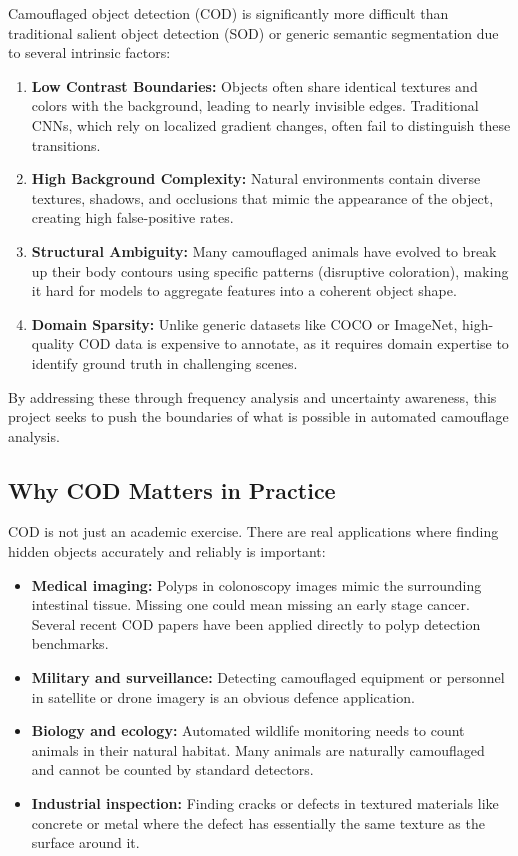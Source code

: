 \documentclass[12pt,a4paper]{report}
\begin{document}
Camouflaged object detection (COD) is significantly more difficult than traditional salient object detection (SOD) or generic semantic segmentation due to several intrinsic factors:

\begin{enumerate}
    \item \textbf{Low Contrast Boundaries:} Objects often share identical textures and colors with the background, leading to nearly invisible edges. Traditional CNNs, which rely on localized gradient changes, often fail to distinguish these transitions.
    \item \textbf{High Background Complexity:} Natural environments contain diverse textures, shadows, and occlusions that mimic the appearance of the object, creating high false-positive rates.
    \item \textbf{Structural Ambiguity:} Many camouflaged animals have evolved to break up their body contours using specific patterns (disruptive coloration), making it hard for models to aggregate features into a coherent object shape.
    \item \textbf{Domain Sparsity:} Unlike generic datasets like COCO or ImageNet, high-quality COD data is expensive to annotate, as it requires domain expertise to identify ground truth in challenging scenes.
\end{enumerate}

By addressing these through frequency analysis and uncertainty awareness, this project seeks to push the boundaries of what is possible in automated camouflage analysis.

\subsection*{Why COD Matters in Practice}

COD is not just an academic exercise. There are real applications where finding hidden objects accurately and reliably is important:

\begin{itemize}
  \item \textbf{Medical imaging:} Polyps in colonoscopy images mimic the surrounding intestinal tissue. Missing one could mean missing an early stage cancer. Several recent COD papers have been applied directly to polyp detection benchmarks.
  \item \textbf{Military and surveillance:} Detecting camouflaged equipment or personnel in satellite or drone imagery is an obvious defence application.
  \item \textbf{Biology and ecology:} Automated wildlife monitoring needs to count animals in their natural habitat. Many animals are naturally camouflaged and cannot be counted by standard detectors.
  \item \textbf{Industrial inspection:} Finding cracks or defects in textured materials like concrete or metal where the defect has essentially the same texture as the surface around it.
\end{itemize}
\end{document}
